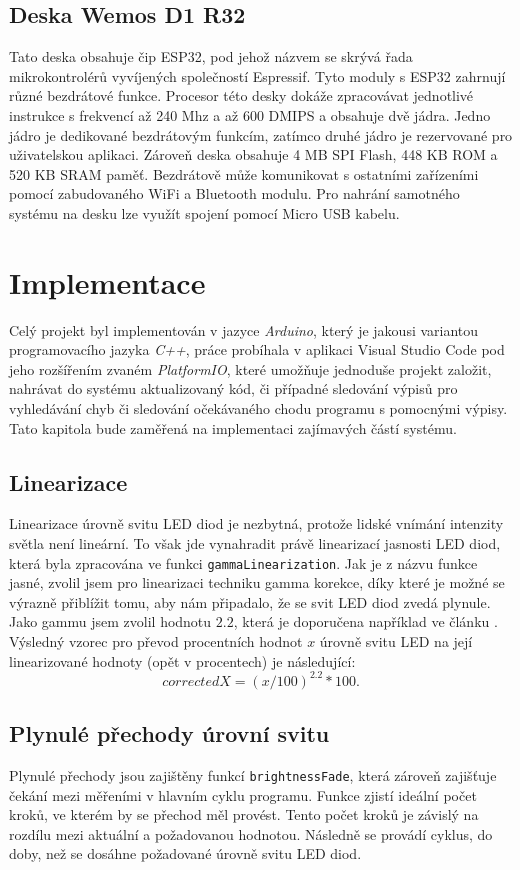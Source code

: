\documentclass[a4paper, 11pt, hidelinks]{article}
\begin{document}
\subsection{Deska Wemos D1 R32}
Tato deska obsahuje čip ESP32, pod jehož názvem se skrývá řada mikrokontrolérů vyvíjených společností Espressif. Tyto moduly s ESP32 zahrnují různé  bezdrátové funkce. \cite{ESP32} Procesor této desky dokáže zpracovávat jednotlivé instrukce s frekvencí až 240 Mhz a až 600 DMIPS a obsahuje dvě jádra. Jedno jádro je dedikované bezdrátovým funkcím, zatímco druhé jádro je rezervované pro uživatelskou aplikaci. Zároveň deska obsahuje 4 MB SPI Flash, 448 KB ROM a 520 KB SRAM paměť. Bezdrátově může komunikovat s ostatními zařízeními pomocí zabudovaného WiFi a Bluetooth modulu. Pro nahrání samotného systému na desku lze využít spojení pomocí Micro USB kabelu. \cite{WemosD1R32}

\section{Implementace}
Celý projekt byl implementován v jazyce \textit{Arduino}, který je jakousi variantou programovacího jazyka \textit{C++}, práce probíhala v aplikaci Visual Studio Code pod jeho rozšířením zvaném \textit{PlatformIO}, které umožňuje jednoduše projekt založit, nahrávat do systému aktualizovaný kód, či případné sledování výpisů pro vyhledávání chyb či sledování očekávaného chodu programu s pomocnými výpisy. Tato kapitola bude zaměřená na implementaci zajímavých částí systému. 

\subsection{Linearizace}
Linearizace úrovně svitu LED diod je nezbytná, protože lidské vnímání intenzity světla není lineární. To však jde vynahradit právě linearizací jasnosti LED diod, která byla zpracována ve funkci \texttt{gammaLinearization}. Jak je z názvu funkce jasné, zvolil jsem pro linearizaci techniku gamma korekce, díky které je možné se výrazně přiblížit tomu, aby nám připadalo, že se svit LED diod zvedá plynule. \cite{gamma-correction} Jako gammu jsem zvolil hodnotu $2.2$, která je doporučena například ve článku \cite{gamma-correction2}. Výsledný vzorec pro převod procentních hodnot $x$ úrovně svitu LED na její linearizované hodnoty (opět v procentech) je následující: $$correctedX = (x / 100)^{2.2} * 100.$$

\newpage

\subsection{Plynulé přechody úrovní svitu}
Plynulé přechody jsou zajištěny funkcí \texttt{brightnessFade}, která zároveň zajišťuje čekání mezi měřeními v hlavním cyklu programu. Funkce zjistí ideální počet kroků, ve kterém by se přechod měl provést. Tento počet kroků je závislý na rozdílu mezi aktuální a požadovanou hodnotou. Následně se provádí cyklus, do doby, než se dosáhne požadované úrovně svitu LED diod.
\end{document}
